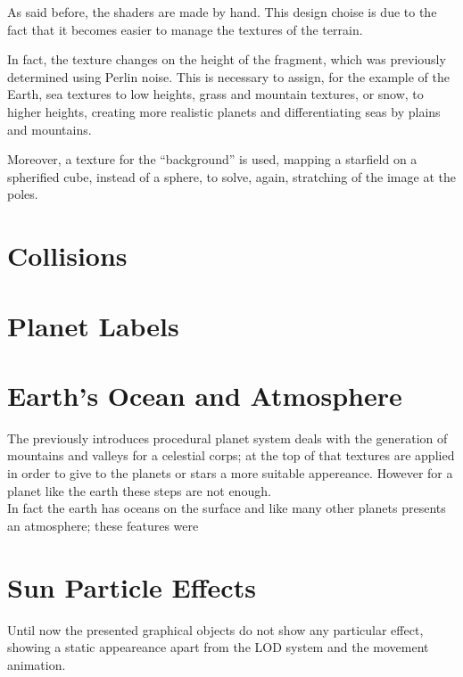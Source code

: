\documentclass[paper=a4, fontsize=11pt]{scrartcl} %
\numberwithin{equation}{section} %
\numberwithin{figure}{section} %
\numberwithin{table}{section} %
\theoremstyle{definition}
\begin{document}
As said before, the shaders are made by hand. This design choise is due to
the fact that it becomes easier to manage the textures of the terrain.

In fact, the texture changes on the height of the fragment, which was previously
determined using Perlin noise. This is necessary to assign, for the example
of the Earth, sea textures to low
heights, grass and mountain textures, or snow, to higher heights, creating
more realistic planets and differentiating seas by plains and mountains.

Moreover, a texture for the ``background'' is used, mapping a starfield on a
spherified cube, instead of a sphere, to solve, again, stratching of the image at the poles.


\section{Collisions}



\section{Planet Labels}


\section{Earth's Ocean and Atmosphere}
The previously introduces procedural planet system deals with the generation of mountains and valleys for a celestial corps; at the top of that textures are applied in order to give to the planets or stars a more suitable appereance. However for a planet like the earth these steps are not enough.\\
In fact the earth has oceans on the surface and like many other planets presents an atmosphere; these features were 


\section{Sun Particle Effects}
Until now the presented graphical objects do not show any particular effect, showing a static appeareance apart from the LOD system and the movement animation. 
\end{document}
